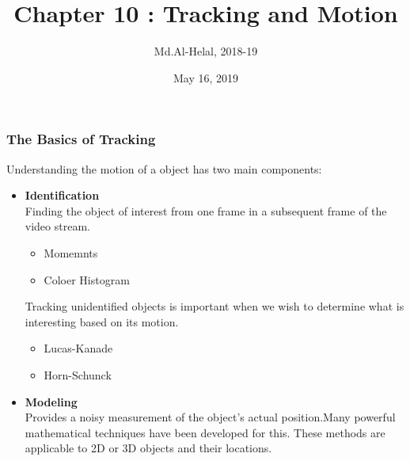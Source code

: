\documentclass[usenames,dvipsnames]{beamer}
\begin{document}
\author{Md.Al-Helal, 2018-19}
\title{Chapter 10 : Tracking and Motion}
\date{May 16, 2019}
\begin{frame}
  \maketitle
\end{frame}
\begin{frame}
\frametitle{The Basics of Tracking}
Understanding the motion of a object has two main components:
\begin{itemize}
\item \textbf{Identification}\\
Finding the object of interest from one frame in a subsequent
frame of the video stream.
\begin{itemize}
\item Momemnts
\item Coloer Histogram
\end{itemize}
Tracking unidentified objects is important when we wish to determine what is interesting based on its motion.
\begin{itemize}
\item Lucas-Kanade
\item Horn-Schunck
\end{itemize}
\item \textbf{Modeling}\\
Provides a noisy measurement of the object’s actual position.Many
powerful mathematical techniques have been developed for this. These methods are applicable to 2D or 3D objects and their locations.
\end{itemize}
\end{frame}
\end{document}
